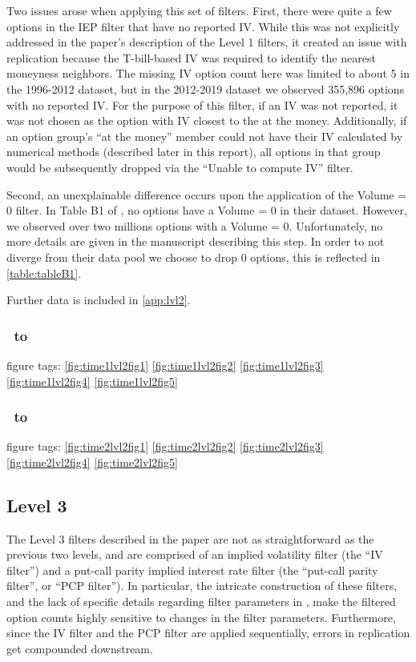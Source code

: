 Two issues arose when applying this set of filters. First, there were quite a few options in the IEP filter that have no reported IV. While this was not explicitly addressed in the paper's description of the Level 1 filters, it created an issue with replication because the T-bill-based IV was required to identify the nearest moneyness neighbors. The missing IV option count here was limited to about 5 in the 1996-2012 dataset, but in the 2012-2019 dataset we observed 355,896 options with no reported IV. For the purpose of this filter, if an IV was not reported, it was not chosen as the option with IV closest to the at the money. Additionally, if an option group's ``at the money'' member could not have their IV calculated by numerical methods (described later in this report), all options in that group would be subsequently dropped via the ``Unable to compute IV'' filter. 

Second, an unexplainable difference occurs upon the application of the Volume = 0 filter. In Table B1 of \citet{constantinides2013}, no options have a Volume = 0 in their dataset. However, we observed over two millions options with a Volume = 0. Unfortunately, no more details are given in the manuscript describing this step. In order to not diverge from their data pool we choose to drop 0 options, this is reflected in \autoref{table:tableB1}. 

Further data is included in \autoref{app:lvl2}. 


\subsubsection{\STARTONE\ to \ENDONE }
figure tags: 
\autoref{fig:time1lvl2fig1}
\autoref{fig:time1lvl2fig2}
\autoref{fig:time1lvl2fig3}
\autoref{fig:time1lvl2fig4}
\autoref{fig:time1lvl2fig5}

\subsubsection{\STARTTWO\ to \ENDTWO }
figure tags: 
\autoref{fig:time2lvl2fig1}
\autoref{fig:time2lvl2fig2}
\autoref{fig:time2lvl2fig3}
\autoref{fig:time2lvl2fig4}
\autoref{fig:time2lvl2fig5}


\subsection{Level 3} 

The Level 3 filters described in the paper are not as straightforward as the previous two levels, and are comprised of an implied volatility filter (the ``IV filter'') and a put-call parity implied interest rate filter (the ``put-call parity filter'', or ``PCP filter''). In particular, the intricate construction of these filters, and the lack of specific details regarding filter parameters in \citet{constantinides2013}, make the filtered option counts highly sensitive to changes in the filter parameters. Furthermore, since the IV filter and the PCP filter are applied sequentially, errors in replication get compounded downstream. 

